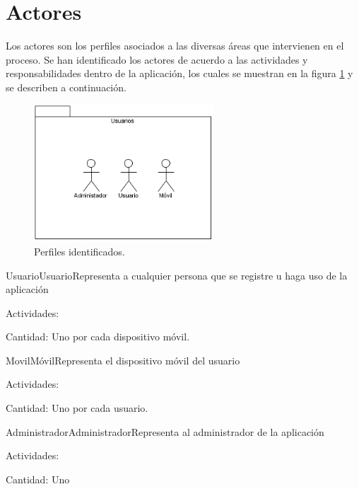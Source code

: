 \section{Actores}

Los actores son los perfiles asociados a las diversas áreas que intervienen en el proceso. Se han identificado los actores de acuerdo a las actividades y responsabilidades dentro de la aplicación, los cuales se muestran en la figura \ref{fig:perfiles} y se describen a continuación.


    \begin{figure}[htbp!]
      \begin{center}
      \includegraphics[width=0.6\textwidth]{ModeloComportamiento/imagenes/Actores.png}
      \caption{Perfiles identificados.}
      \label{fig:perfiles}
      \end{center}
    \end{figure}

\begin{actor}{Usuario}{Usuario}{Representa a cualquier persona que se registre u haga uso de la aplicación}
	\item[Actividades:]
	\item[Cantidad:] Uno por cada dispositivo móvil.
	
\end{actor}


\begin{actor}{Movil}{Móvil}{Representa el dispositivo móvil del usuario}
	\item[Actividades:]
	\item[Cantidad:] Uno por cada usuario.
	
\end{actor}

\begin{actor}{Administrador}{Administrador}{Representa al administrador de la aplicación}
	\item[Actividades:]
	\item[Cantidad:] Uno
	
\end{actor}